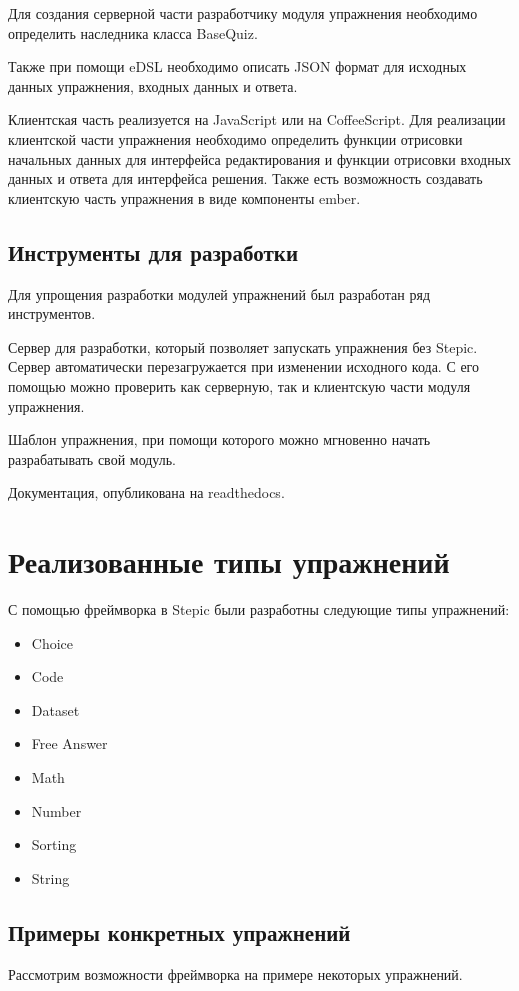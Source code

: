\documentclass{matmex-diploma-custom}
\begin{document}
Для создания серверной части разработчику модуля упражнения необходимо
определить наследника класса BaseQuiz.

Также при помощи eDSL необходимо описать JSON формат для исходных
данных упражнения, входных данных и ответа.

Клиентская часть реализуется на JavaScript или на CoffeeScript. Для
реализации клиентской части упражнения необходимо определить функции
отрисовки начальных данных для интерфейса редактирования и функции
отрисовки входных данных и ответа для интерфейса решения. Также есть
возможность создавать клиентскую часть упражнения в виде компоненты ember.

\subsection{Инструменты для разработки}
Для упрощения разработки модулей упражнений был разработан ряд
инструментов.

Сервер для разработки, который позволяет запускать упражнения без
Stepic. Сервер автоматически перезагружается при изменении исходного
кода. С его помощью можно проверить как серверную, так и клиентскую
части модуля упражнения.

Шаблон упражнения, при помощи которого можно мгновенно начать
разрабатывать свой модуль.

Документация, опубликована на readthedocs\cite{plugins:doc}.

\section{Реализованные типы упражнений}

С помощью фреймворка в Stepic были разработны следующие типы упражнений:
\begin{itemize}
\item Choice
\item Code
\item Dataset
\item Free Answer
\item Math
\item Number
\item Sorting
\item String
\end{itemize}

\subsection{Примеры конкретных упражнений}
Рассмотрим возможности фреймворка на примере некоторых упражнений.
\end{document}
